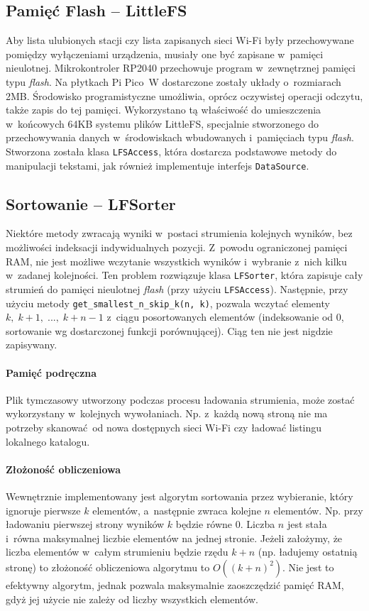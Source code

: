 \documentclass[polish]{aghengthesis}
\begin{document}
		\subsection{Pamięć Flash -- LittleFS}
			Aby lista ulubionych stacji czy lista zapisanych sieci Wi-Fi były przechowywane pomiędzy wyłączeniami urządzenia, musiały one być zapisane w~pamięci nieulotnej. Mikrokontroler RP2040 przechowuje program w~zewnętrznej pamięci typu \textit{flash}. Na płytkach Pi Pico~W dostarczone zostały układy o~rozmiarach 2MB. Środowisko programistyczne umożliwia, oprócz oczywistej operacji odczytu, także zapis do tej pamięci. Wykorzystano tą właściwość do umieszczenia w~końcowych 64KB systemu plików LittleFS\textsuperscript{\cite{littlefs}}, specjalnie stworzonego do przechowywania danych w~środowiskach wbudowanych i~pamięciach typu \textit{flash}. Stworzona została klasa \lstinline|LFSAccess|, która dostarcza podstawowe metody do manipulacji tekstami, jak również implementuje interfejs \lstinline|DataSource|.
			
		\subsection{Sortowanie -- LFSorter}
			Niektóre metody zwracają wyniki w~postaci strumienia kolejnych wyników, bez możliwości indeksacji indywidualnych pozycji. Z~powodu ograniczonej pamięci RAM, nie jest możliwe wczytanie wszystkich wyników i~wybranie z~nich kilku w~zadanej kolejności. Ten problem rozwiązuje klasa \lstinline|LFSorter|, która zapisuje cały strumień do pamięci nieulotnej \textit{flash} (przy użyciu \lstinline|LFSAccess|). Następnie, przy użyciu metody \lstinline|get_smallest_n_skip_k(n, k)|, pozwala wczytać elementy $k,\; k+1,\; ...,\; k+n-1$ z~ciągu posortowanych elementów (indeksowanie od 0, sortowanie wg dostarczonej funkcji porównującej). Ciąg ten nie jest nigdzie zapisywany.
			
			\paragraph{Pamięć podręczna}
			Plik tymczasowy utworzony podczas procesu ładowania strumienia, może zostać wykorzystany w~kolejnych wywołaniach. Np. z~każdą nową stroną nie ma potrzeby skanować od nowa dostępnych sieci Wi-Fi czy ładować listingu lokalnego katalogu.
						
			\paragraph{Złożoność obliczeniowa}
			Wewnętrznie implementowany jest algorytm sortowania przez wybieranie, który ignoruje pierwsze $k$ elementów, a~następnie zwraca kolejne $n$ elementów. Np. przy ładowaniu pierwszej strony wyników $k$ będzie równe 0. Liczba $n$ jest stała i~równa maksymalnej liczbie elementów na jednej stronie. Jeżeli założymy, że liczba elementów w~całym strumieniu będzie rzędu $k+n$ (np. ładujemy ostatnią stronę) to złożoność obliczeniowa algorytmu to $O((k+n)^2)$. Nie jest to efektywny algorytm, jednak pozwala maksymalnie zaoszczędzić pamięć RAM, gdyż jej użycie nie zależy od liczby wszystkich elementów.
			
\end{document}
